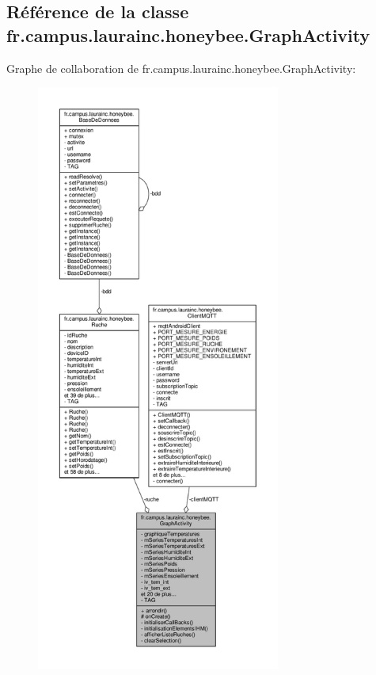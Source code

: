 \hypertarget{classfr_1_1campus_1_1laurainc_1_1honeybee_1_1_graph_activity}{}\subsection{Référence de la classe fr.\+campus.\+laurainc.\+honeybee.\+Graph\+Activity}
\label{classfr_1_1campus_1_1laurainc_1_1honeybee_1_1_graph_activity}


Graphe de collaboration de fr.\+campus.\+laurainc.\+honeybee.\+Graph\+Activity\+:\nopagebreak
\begin{figure}[H]
\begin{center}
\leavevmode
\includegraphics[height=550pt]{classfr_1_1campus_1_1laurainc_1_1honeybee_1_1_graph_activity__coll__graph}
\end{center}
\end{figure}
